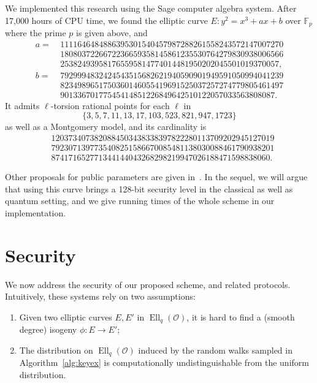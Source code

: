\documentclass{article}
\newcommand{\F}{\mathbb{F}}
\renewcommand{\O}{\mathcal{O}}
\theoremstyle{definition}
\DeclareMathOperator{\Ell}{Ell}
\begin{document}
We implemented this research using the Sage computer algebra system.
After 17,000 hours of CPU time, we found the elliptic curve
$
	E : y^2 = x^3 + ax + b
$
over $\F_p$ where the prime $p$ is given above, and
\[
\begin{aligned}
a =\ & 1111646484886395301540457987288261558243572147007270 \\ 
& 1808037226672236659358145861235530764279830938006566 \\
& 253824939581765595814774014481950202045501019370057,\\
b =\ & 7929994832424543515682621940590901949591050994041239 \\
& 8234989651750360146055419691525037257274779805461497 \\ 
& 90133670177545414851226849642510122057033563808087.
\end{aligned}
\]
It admits $\ell$-torsion rational points for each $\ell$ in
\[
  \{3, 5, 7, 11, 13, 17, 103, 523, 821, 947, 1723\}
\]
as well as a Montgomery model, and its cardinality is
\[
\begin{aligned}
& 1203734073820884503438338397822280113709202945127019 \\ 
& 7923071397735408251586670085481138030088461790938201 \\
& 874171652771344144043268298219947026188471598838060.
\end{aligned}
\]

Other proposals for public parameters are given in~\cite{todo:memoire}.
In the sequel, we will argue that using this curve brings a 128-bit security level
in the classical as well as quantum setting, and we give running times of the whole
scheme in our implementation.

\section{Security}
\label{sec:sec}

We now address the security of our proposed scheme, and related
protocols. Intuitively, these systems rely on two assumptions:
\begin{enumerate}
\item Given two elliptic curves $E,E'$ in $\Ell_q(\O)$, it is hard to
  find a (smooth degree) isogeny $ϕ:E→E'$;
\item The distribution on $\Ell_q(\O)$ induced by the random walks
  sampled in Algorithm~\ref{alg:keyex} is computationally
  undistinguishable from the uniform distribution.
\end{enumerate}
\end{document}
